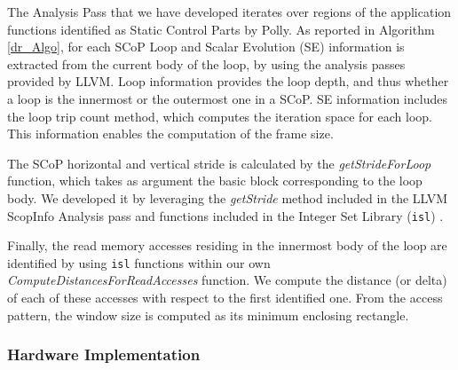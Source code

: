 \documentclass[]{usiinfthesis}
\begin{document}
The Analysis Pass that we have developed iterates over regions of the
application functions identified as Static Control Parts by
Polly.  As reported in Algorithm \ref{dr_Algo}, for each SCoP Loop and
Scalar Evolution (SE) information is extracted from the current body
of the loop, by using the analysis passes provided by LLVM. Loop
information provides the loop depth, and thus whether a loop is the
innermost or the outermost one in a SCoP. SE information includes the
loop trip count method, which computes the iteration space
for each loop. This information enables the computation of the frame size.\par


The SCoP horizontal and vertical stride is calculated by the {\em
  getStrideForLoop} function, which takes as argument the basic
block corresponding to the loop body. We developed it by leveraging
the {\em getStride} method included in the LLVM ScopInfo Analysis
pass and functions included in the Integer Set Library (\texttt{isl})
\cite{verdoolaege2010isl}.

Finally, the read memory accesses residing in the innermost body of
the loop are identified by using \texttt{isl} functions within our own
{\em ComputeDistancesForReadAccesses} function. We compute the
distance (or delta) of each of these accesses with respect to the
first identified one. From the access pattern, the window size is
computed as its minimum enclosing rectangle.

\subsubsection{Hardware Implementation}
\label{subsec:impl}
\end{document}
